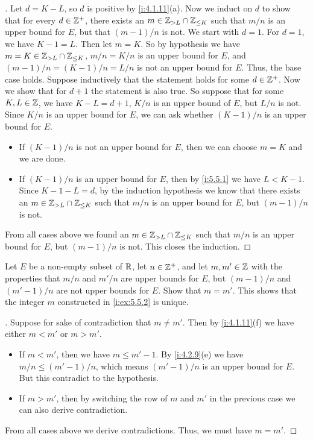 \begin{proof}[]
  Let \(d = K - L\), so \(d\) is positive by \cref{i:4.1.11}(a).
  Now we induct on \(d\) to show that for every \(d \in \mathbb{Z}^+\), there exists an \(m \in \mathbb{Z}_{> L} \cap \mathbb{Z}_{\leq K}\) such that \(m / n\) is an upper bound for \(E\), but that \((m - 1) / n\) is not.
  We start with \(d = 1\).
  For \(d = 1\), we have \(K - 1 = L\).
  Then let \(m = K\).
  So by hypothesis we have \(m = K \in \mathbb{Z}_{> L} \cap \mathbb{Z}_{\leq K}\), \(m / n = K / n\) is an upper bound for \(E\), and \((m - 1) / n = (K - 1) / n = L / n\) is not an upper bound for \(E\).
  Thus, the base case holds.
  Suppose inductively that the statement holds for some \(d \in \mathbb{Z}^+\).
  Now we show that for \(d + 1\) the statement is also true.
  So suppose that for some \(K, L \in \mathbb{Z}\), we have \(K - L = d + 1\), \(K / n\) is an upper bound of \(E\), but \(L / n\) is not.
  Since \(K / n\) is an upper bound for \(E\), we can ask whether \((K - 1) / n\) is an upper bound for \(E\).
  \begin{itemize}
    \item If \((K - 1) / n\) is not an upper bound for \(E\), then we can choose \(m = K\) and we are done.
    \item If \((K - 1) / n\) is an upper bound for \(E\), then by \cref{i:5.5.1} we have \(L < K - 1\).
          Since \(K - 1 - L = d\), by the induction hypothesis we know that there exists an \(m \in \mathbb{Z}_{> L} \cap \mathbb{Z}_{\leq K}\) such that \(m / n\) is an upper bound for \(E\), but \((m - 1) / n\) is not.
  \end{itemize}
  From all cases above we found an \(m \in \mathbb{Z}_{> L} \cap \mathbb{Z}_{\leq K}\) such that \(m / n\) is an upper bound for \(E\), but \((m - 1) / n\) is not.
  This closes the induction.
\end{proof}

\begin{ex}\label{i:ex:5.5.3}
  Let \(E\) be a non-empty subset of \(\mathbb{R}\), let \(n \in \mathbb{Z}^+\), and let \(m, m' \in \mathbb{Z}\) with the properties that \(m / n\) and \(m' / n\) are upper bounds for \(E\), but \((m - 1) / n\) and \((m' - 1) / n\) are not upper bounds for \(E\).
  Show that \(m = m'\).
  This shows that the integer \(m\) constructed in \cref{i:ex:5.5.2} is unique.
\end{ex}

\begin{proof}[]
  Suppose for sake of contradiction that \(m \neq m'\).
  Then by \cref{i:4.1.11}(f) we have either \(m < m'\) or \(m > m'\).
  \begin{itemize}
    \item If \(m < m'\), then we have \(m \leq m' - 1\).
          By \cref{i:4.2.9}(e) we have \(m / n \leq (m' - 1) / n\), which means \((m' - 1) / n\) is an upper bound for \(E\).
          But this contradict to the hypothesis.
    \item If \(m > m'\), then by switching the row of \(m\) and \(m'\) in the previous case we can also derive contradiction.
  \end{itemize}
  From all cases above we derive contradictions.
  Thus, we must have \(m = m'\).
\end{proof}

